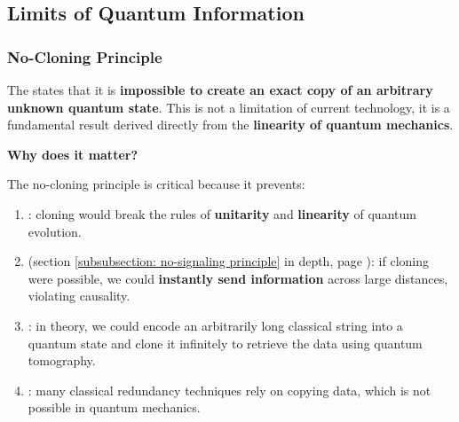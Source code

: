 \subsection{Limits of Quantum Information}

\subsubsection{No-Cloning Principle}

The  states that it is \textbf{impossible to create an exact copy of an arbitrary unknown quantum state}. This is not a limitation of current technology, it is a fundamental result derived directly from the \textbf{linearity of quantum mechanics}.

\highspace
\begin{flushleft}
    \textcolor{Green3}{ \textbf{Why does it matter?}}
\end{flushleft}
The no-cloning principle is critical because it prevents:
\begin{enumerate}
    \item {}: cloning would break the rules of \textbf{unitarity} and \textbf{linearity} of quantum evolution.

    \item {} (section \ref{subsubsection: no-signaling principle} in depth, page \pageref{subsubsection: no-signaling principle}): if cloning were possible, we could \textbf{instantly send information} across large distances, violating causality.
    
    \item {}: in theory, we could encode an arbitrarily long classical string into a quantum state and clone it infinitely to retrieve the data using quantum tomography.

    \item {}: many classical redundancy techniques rely on copying data, which is not possible in quantum mechanics.
\end{enumerate}


